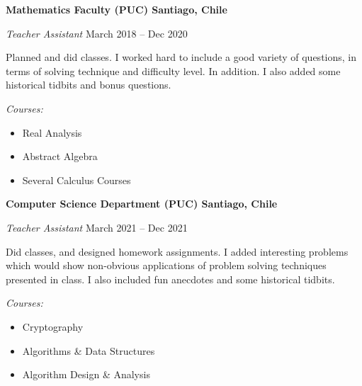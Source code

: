 \documentclass[../main.tex]{subfiles}
\begin{document}
    \textbf{Mathematics Faculty (PUC) \hfill  Santiago, Chile} \par
    \textit{Teacher Assistant} \hfill March 2018 -- Dec 2020 \par
    \vspace{5pt}
    \hspace*{1em}\begin{minipage}{\dimexpr\textwidth-4em}
        \noindent Planned and did classes. I worked hard to include a good variety of questions, in terms of solving technique and difficulty level. In addition. I also added some historical tidbits and bonus questions.\par
    \end{minipage}
    \vspace{5pt}\par
    \textit{Courses:}
    \begin{itemize}
        \item Real Analysis
        \item Abstract Algebra
        \item Several Calculus Courses
    \end{itemize} \par
    \textbf{Computer Science Department (PUC) \hfill  Santiago, Chile} \par
    \textit{Teacher Assistant} \hfill March 2021 -- Dec 2021 \par
    \vspace{5pt}
    \hspace*{1em}\begin{minipage}{\dimexpr\textwidth-4em}
        \noindent Did classes, and designed homework assignments. I added interesting problems which would show non-obvious applications of problem solving techniques presented in class. I also included fun anecdotes and some historical tidbits.\par
    \end{minipage}
    \vspace{5pt}\par
    \textit{Courses:}
    \begin{itemize}
        \item Cryptography
        \item Algorithms \& Data Structures
        \item Algorithm Design \& Analysis
    \end{itemize} \par
\end{document}
